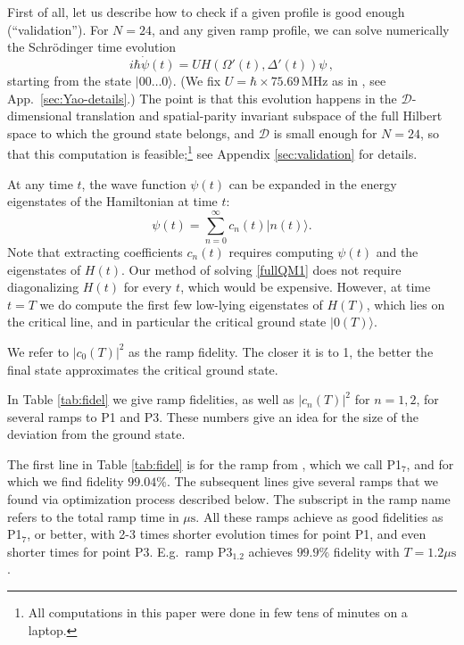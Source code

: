 \documentclass[a4paper,12pt]{article}
\theoremstyle{remark}
\theoremstyle{theorem}
\begin{document}
First of all, let us describe how to check if a given profile is good enough (``validation''). For $N=24$, and any given ramp profile, we can solve numerically the Schr\"odinger time evolution
\begin{equation}
	i \hbar \dot{\psi} (t) = U H (\Omega' (t), \Delta' (t)) \psi\,, \label{fullQM1}
\end{equation}
starting from the state $| 00 \ldots 0 \rangle$. (We fix $U = \hbar \times
75.69\,\text{MHz}$ as in {\cite{Fang:2024uyf}}, see App.~\ref{sec:Yao-details}.) The point is that this evolution happens in the $\mathcal{D}$-dimensional translation and
spatial-parity invariant subspace of the full Hilbert space to which the ground state belongs, and $\mathcal{D}$ is small enough for $N=24$, so that this computation is feasible;\footnote{All computations in this paper were done in few tens of minutes on a laptop.} see Appendix \ref{sec:validation} for details. 

At any time $t$, the wave function $\psi (t)$ can be expanded in the energy eigenstates of the Hamiltonian at time
$t$:
\begin{equation}
	\psi (t) = \sum_{n = 0}^{\infty} c_n (t)  | n (t)  \rangle .
	\label{eq:psiexp12}
\end{equation}
Note that extracting coefficients $c_n (t)$ requires computing $\psi(t)$ and the eigenstates of $H(t)$. Our method of solving \eqref{fullQM1} does not require diagonalizing $H(t)$ for every $t$, which would be expensive. However, at time $t=T$ we do compute the first few low-lying eigenstates of $H(T)$, which lies on the critical line, and in particular the critical ground state $|0(T)\rangle$.

We refer to $| c_0 (T) |^2$ as the ramp fidelity. The closer it is to 1, the
better the final state approximates the critical ground state. 

In Table \ref{tab:fidel} we give ramp fidelities, as well as $| c_n (T) |^2$ for $n=1,2$, for several ramps to P1 and P3. These numbers give an idea for the size of the deviation from the ground state. 

The first line in Table \ref{tab:fidel} is for the ramp from \cite{Fang:2024uyf}, which we call P1$_{7}$, and for which we find fidelity $99.04\%$. The subsequent lines give several ramps that we found via optimization process described below. The subscript in the ramp name refers to the total ramp time in $\mu{\text{s}}$. All these ramps achieve as good fidelities as P1$_7$, or better, with 2-3 times shorter evolution times for point P1,
and even shorter times for point P3. E.g.~ramp P3$_{1.2}$ achieves $99.9\%$ fidelity with $T=1.2 \mu\text{s}$.
\end{document}
